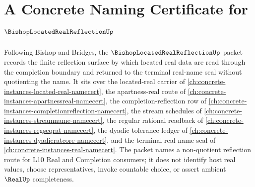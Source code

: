 \chapter{A Concrete Naming Certificate for $\BishopLocatedRealReflectionUp$}
\label{ch:concrete-instances-bishop-located-real-reflection-namecert}

Following Bishop and Bridges, the $\BishopLocatedRealReflectionUp$ packet records the finite reflection surface by which located real data are read through the completion boundary and returned to the terminal real-name seal without quotienting the name. It sits over the located-real carrier of \autoref{ch:concrete-instances-located-real-namecert}, the apartness-real route of \autoref{ch:concrete-instances-apartnessreal-namecert}, the completion-reflection row of \autoref{ch:concrete-instances-completionreflection-namecert}, the stream schedules of \autoref{ch:concrete-instances-streamname-namecert}, the regular rational readback of \autoref{ch:concrete-instances-regseqrat-namecert}, the dyadic tolerance ledger of \autoref{ch:concrete-instances-dyadicratcore-namecert}, and the terminal real-name seal of \autoref{ch:concrete-instances-real-namecert}. The packet names a non-quotient reflection route for L10 Real and Completion consumers; it does not identify host real values, choose representatives, invoke countable choice, or assert ambient $\RealUp$ completeness.

